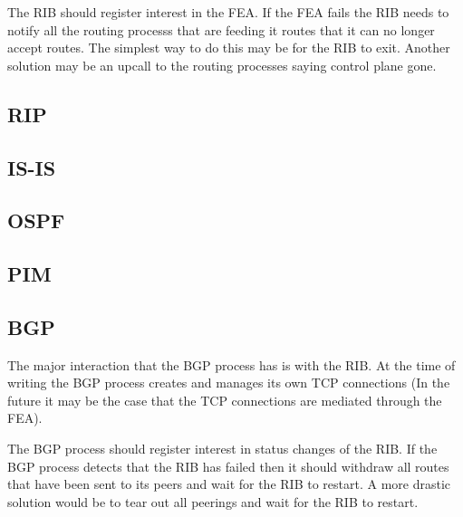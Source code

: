 \documentclass[11pt]{article}
\begin{document}
The RIB should register interest in the FEA. If the FEA fails the RIB
needs to notify all the routing processs that are feeding it routes
that it can no longer accept routes. The simplest way to do this may
be for the RIB to exit. Another solution may be an upcall to the
routing processes saying control plane gone.


\subsection{RIP}

\subsection{IS-IS}

\subsection{OSPF}

\subsection{PIM}

\subsection{BGP}
The major interaction that the BGP process has is with the RIB. At the
time of writing the BGP process creates and manages its own TCP
connections (In the future it may be the case that the TCP connections
are mediated through the FEA). 

The BGP process should register interest in status changes of the RIB.
If the BGP process detects that the RIB has failed then it should
withdraw all routes that have been sent to its peers and wait for the
RIB to restart. A more drastic solution would be to tear out all
peerings and wait for the RIB to restart.



\end{document}
